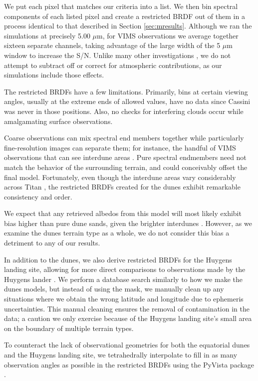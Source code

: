 \documentclass[twocolumn,linenumbers]{aastex631}
\begin{document}
We put each pixel that matches our criteria into a list. We then bin spectral components of each listed pixel and create a restricted BRDF out of them in a process identical to that described in Section \ref{sec:mresults}. Although we ran the simulations at precisely 5.00 $\mu$m, for VIMS observations we average together sixteen separate channels, taking advantage of the large width of the 5 $\mu$m window to increase the S/N. Unlike many other investigations \citep{Buratti2006, Bonnefoy2016, Brossier2018, EsSayeh2023}, we do not attempt to subtract off or correct for atmospheric contributions, as our simulations include those effects.

The restricted BRDFs have a few limitations. Primarily, bins at certain viewing angles, usually at the extreme ends of allowed values, have no data since Cassini was never in those positions. Also, no checks for interfering clouds occur while amalgamating surface observations.

Coarse observations can mix spectral end members together while particularly fine-resolution images can separate them; for instance, the handful of VIMS observations that can see interdune areas \citep{Barnes2008}. Pure spectral endmembers need not match the behavior of the surrounding terrain, and could conceivably offset the final model. Fortunately, even though the interdune areas vary considerably across Titan \citep{Bonnefoy2016}, the restricted BRDFs created for the dunes exhibit remarkable consistency and order.

We expect that any retrieved albedos from this model will most likely exhibit bias higher than pure dune sands, given the brighter interdunes \citep{Bonnefoy2016}. However, as we examine the dunes terrain type as a whole, we do not consider this bias a detriment to any of our results.

In addition to the dunes, we also derive restricted BRDFs for the Huygens landing site, allowing for more direct comparisons to observations made by the Huygens lander \citep{Tomasko2008}. We perform a database search similarly to how we make the dunes models, but instead of using the mask, we manually clean up any situations where we obtain the wrong latitude and longitude due to ephemeris uncertainties. This manual cleaning ensures the removal of contamination in the data; a caution we only exercise because of the Huygens landing site's small area on the boundary of multiple terrain types.

To counteract the lack of observational geometries for both the equatorial dunes and the Huygens landing site, we tetrahedrally interpolate to fill in as many observation angles as possible in the restricted BRDFs using the PyVista package \citep{Sullivan2019}.
\end{document}

